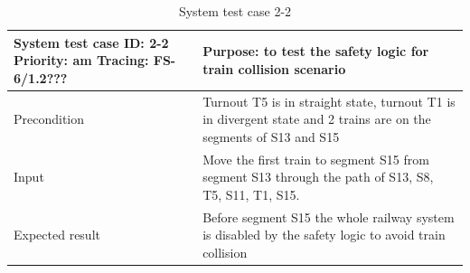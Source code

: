 \begin{table}[H]
	\caption{System test case 2-2}
	\label{table:TCase-FSS2-2}
	\begin{center}
		\renewcommand{\arraystretch}{1.8}
		\begin{tabu} 
			to 0.9 \textwidth
			{  X[0.4, c] X[c] }
			\toprule
			System test case ID: 2-2 \newline Priority: am \newline Tracing: FS-6/1.2??? & Purpose: to test the safety logic for train collision scenario                                                    \\ \midrule
			Precondition                                                                 & Turnout T5 is in straight state, turnout T1 is in divergent state and 2 trains are on the segments of S13 and S15 \\
			Input                                                                        & Move the first train to segment S15 from segment S13 through the path of S13, S8, T5, S11, T1, S15.               \\
			Expected result                                                              & Before segment S15 the whole railway system is disabled by the safety logic to avoid train collision              \\ \bottomrule
		\end{tabu}
	\end{center}
\end{table}